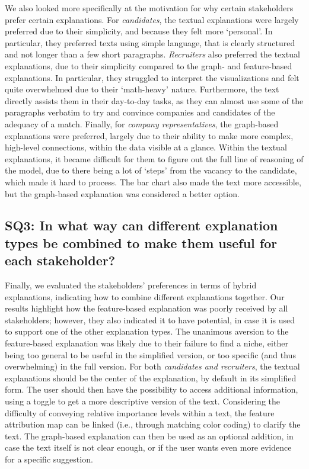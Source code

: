 We also looked more specifically at the motivation for why certain stakeholders prefer certain explanations. For \textit{candidates}, the textual explanations were largely preferred due to their simplicity, and because they felt more `personal'. In particular, they preferred texts using simple language, that is clearly structured and not longer than a few short paragraphs. \textit{Recruiters} also preferred the textual explanations, due to their simplicity compared to the graph- and feature-based explanations. In particular, they struggled to interpret the visualizations and felt quite overwhelmed due to their `math-heavy' nature. Furthermore, the text directly assists them in their day-to-day tasks, as they can almost use some of the paragraphs verbatim to try and convince companies and candidates of the adequacy of a match. Finally, for \textit{company representatives}, the graph-based explanations were preferred, largely due to their ability to make more complex, high-level connections, within the data visible at a glance. Within the textual explanations, it became difficult for them to figure out the full line of reasoning of the model, due to there being a lot of `steps' from the vacancy to the candidate, which made it hard to process. The bar chart also made the text more accessible, but the graph-based explanation was considered a better option.

\subsection{SQ3: In what way can different explanation types be combined to make them useful for each stakeholder?}

Finally, we evaluated the stakeholders' preferences in terms of hybrid explanations, indicating how to combine different explanations together. Our results highlight how the feature-based explanation was poorly received by all stakeholders; however, they also indicated it to have potential, in case it is used to support one of the other explanation types. The unanimous aversion to the feature-based explanation was likely due to their failure to find a niche, either being too general to be useful in the simplified version, or too specific (and thus overwhelming) in the full version. For both \textit{candidates and recruiters}, the textual explanations should be the center of the explanation, by default in its simplified form. The user should then have the possibility to access additional information, using a toggle to get a more descriptive version of the text. Considering the difficulty of conveying relative importance levels within a text, the feature attribution map can be linked (i.e., through matching color coding) to clarify the text. The graph-based explanation can then be used as an optional addition, in case the text itself is not clear enough, or if the user wants even more evidence for a specific suggestion. 

